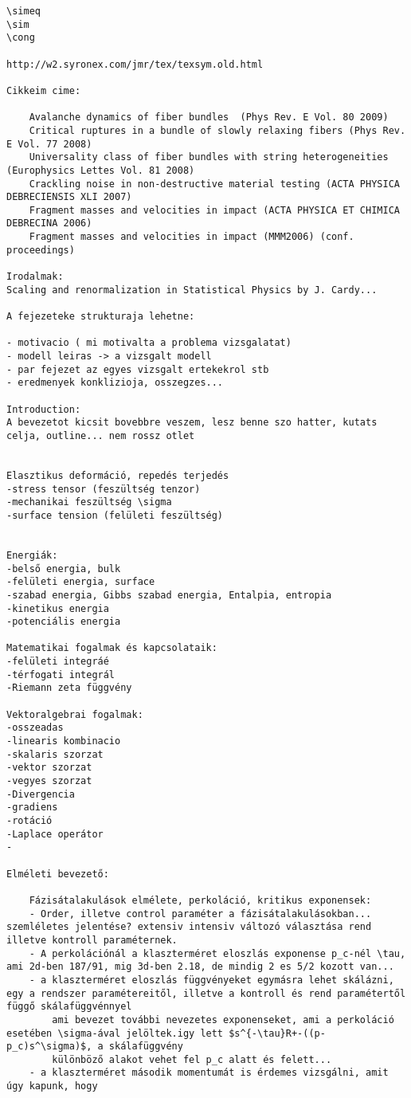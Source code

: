\begin{verbatim}



\simeq
\sim
\cong

http://w2.syronex.com/jmr/tex/texsym.old.html

Cikkeim cime:

	Avalanche dynamics of fiber bundles  (Phys Rev. E Vol. 80 2009)
	Critical ruptures in a bundle of slowly relaxing fibers (Phys Rev. E Vol. 77 2008)
	Universality class of fiber bundles with string heterogeneities (Europhysics Lettes Vol. 81 2008)
	Crackling noise in non-destructive material testing (ACTA PHYSICA DEBRECIENSIS XLI 2007)
	Fragment masses and velocities in impact (ACTA PHYSICA ET CHIMICA DEBRECINA 2006)
	Fragment masses and velocities in impact (MMM2006) (conf. proceedings)

Irodalmak:
Scaling and renormalization in Statistical Physics by J. Cardy...	

A fejezeteke strukturaja lehetne:

- motivacio ( mi motivalta a problema vizsgalatat)
- modell leiras -> a vizsgalt modell
- par fejezet az egyes vizsgalt ertekekrol stb
- eredmenyek konklizioja, osszegzes...

Introduction:
A bevezetot kicsit bovebbre veszem, lesz benne szo hatter, kutats celja, outline... nem rossz otlet


Elasztikus deformáció, repedés terjedés
-stress tensor (feszültség tenzor)
-mechanikai feszültség \sigma 
-surface tension (felületi feszültség)


Energiák:
-belső energia, bulk
-felületi energia, surface
-szabad energia, Gibbs szabad energia, Entalpia, entropia
-kinetikus energia
-potenciális energia

Matematikai fogalmak és kapcsolataik:
-felületi integráé
-térfogati integrál
-Riemann zeta függvény

Vektoralgebrai fogalmak:
-osszeadas
-linearis kombinacio
-skalaris szorzat
-vektor szorzat
-vegyes szorzat
-Divergencia
-gradiens
-rotáció
-Laplace operátor
-	

Elméleti bevezető:

	Fázisátalakulások elmélete, perkoláció, kritikus exponensek:
	- Order, illetve control paraméter a fázisátalakulásokban... szemléletes jelentése? extensiv intensiv változó választása rend illetve kontroll paraméternek.
	- A perkolációnál a klaszterméret eloszlás exponense p_c-nél \tau, ami 2d-ben 187/91, mig 3d-ben 2.18, de mindig 2 es 5/2 kozott van...
	- a klaszterméret eloszlás függvényeket egymásra lehet skálázni, egy a rendszer paramétereitől, illetve a kontroll és rend paramétertől függő skálafüggvénnyel
		ami bevezet további nevezetes exponenseket, ami a perkoláció esetében \sigma-ával jelöltek.igy lett $s^{-\tau}R+-((p-p_c)s^\sigma)$, a skálafüggvény 
		különböző alakot vehet fel p_c alatt és felett...
	- a klaszterméret második momentumát is érdemes vizsgálni, amit úgy kapunk, hogy 
	

\end{verbatim}

